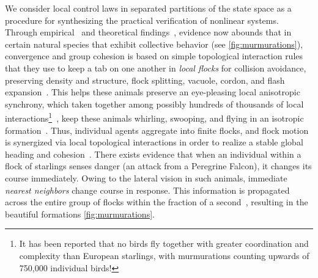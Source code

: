 %
We consider local control laws in separated partitions of the state space as a procedure for synthesizing the practical verification of nonlinear systems. Through empirical~\cite{Ballerini1232, Helbing20, VicsekPhaseNovel} %
and theoretical findings~\cite{JadbabaieCoord}, evidence now abounds that in certain natural species that exhibit collective behavior (see \autoref{fig:murmurations}), convergence and group cohesion is based on simple topological interaction rules that they use to keep a tab on one another in \textit{local flocks} for collision avoidance, preserving density and structure, flock splitting, vacuole, cordon, and flash expansion~\cite{NatGeo}. This helps these animals preserve an eye-pleasing local anisotropic synchrony, which taken together among possibly hundreds of thousands of local interactions\footnote{It has been reported that no birds fly together with greater coordination and complexity than European starlings,  with murmurations counting upwards of 750,000 individual birds!}~\cite{NatGeo}, keep these animals whirling, swooping, and flying in an isotropic formation~\cite{Ballerini1232}. Thus, individual agents aggregate into finite flocks, and flock motion is synergized via local topological interactions in order to realize a stable global heading and cohesion~\cite{JadbabaieCoord}. There exists evidence that when an individual within a flock of starlings senses danger (\eg an attack from a Peregrine Falcon), it changes its course immediately. Owing to the lateral vision in such animals, immediate \textit{nearest neighbors} change course in response. This information is propagated across the entire group of flocks within the fraction of a second~\cite{Ballerini1232}, resulting in the beautiful formations \cf \autoref{fig:murmurations}. 

